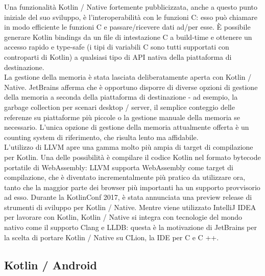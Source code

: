 Una funzionalità Kotlin / Native fortemente pubblicizzata, anche a questo punto iniziale del suo sviluppo, è l'interoperabilità con le funzioni C: esso può chiamare in modo efficiente le funzioni C e passare/ricevere dati ad/per esse. È possibile generare Kotlin bindings da un file di intestazione C a build-time e ottenere un accesso rapido e type-safe (i tipi di variabili C sono tutti supportati con controparti di Kotlin) a qualsiasi tipo di API nativa della piattaforma di destinazione.\\
La gestione della memoria è stata lasciata deliberatamente aperta con Kotlin / Native. JetBrains afferma che è opportuno disporre di diverse opzioni di gestione della memoria a seconda della piattaforma di destinazione - ad esempio, la garbage collection per scenari desktop / server, il semplice conteggio delle referenze su piattaforme più piccole o la gestione manuale della memoria se necessario. L'unica opzione di gestione della memoria attualmente offerta è un counting system di riferimento, che risulta lento ma affidabile.\\

L'utilizzo di LLVM apre una gamma molto più ampia di target di compilazione per Kotlin. Una delle possibilità è compilare il codice Kotlin nel formato bytecode portatile di WebAssembly: LLVM supporta WebAssembly come target di compilazione, che è diventato incrementalmente più pratico da utilizzare ora, tanto che la maggior parte dei browser più importanti ha un supporto provvisorio ad esso.
Durante la KotlinConf 2017, è stata annunciata una preview release di strumenti di sviluppo per Kotlin / Native. Mentre viene utilizzato IntelliJ IDEA per lavorare con Kotlin, Kotlin / Native si integra con tecnologie del mondo nativo come il supporto Clang e LLDB: questa è la motivazione di JetBrains per la scelta di portare Kotlin / Native su CLion, la IDE per C e C ++.\\

\subsection{Kotlin / Android}


